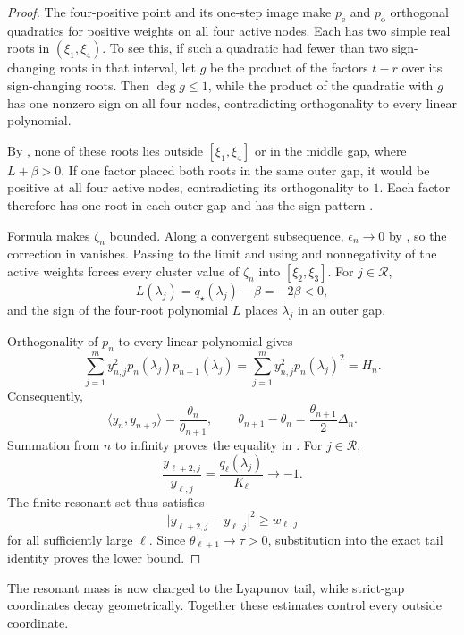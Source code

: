 \documentclass[11pt]{article}
\begin{document}
\begin{proof}
The four-positive point and its one-step image make
\(p_{\mathrm e}\) and \(p_{\mathrm o}\) orthogonal quadratics for positive
weights on all four active nodes.  Each has two simple real roots in
\((\xi_1,\xi_4)\).  To see this, if such a quadratic had fewer than two
sign-changing roots in that interval, let \(g\) be the product of the
factors \(t-r\) over its sign-changing roots.  Then \(\deg g\leq1\), while
the product of the quadratic with \(g\) has one nonzero sign on all four
nodes, contradicting orthogonality to every linear polynomial.

By , none of these roots lies outside
\([\xi_1,\xi_4]\) or in the middle gap, where \(L+\beta>0\).  If one
factor placed both roots in the same outer gap, it would be positive at all
four active nodes, contradicting its orthogonality to \(1\).  Each factor
therefore has one root in each outer gap and has the sign pattern
.

Formula  makes \(\zeta_n\) bounded.  Along a
convergent subsequence, \(\epsilon_n\to0\) by
, so the correction in
 vanishes.  Passing to the limit and using
 and nonnegativity of the active weights
forces every cluster value of \(\zeta_n\) into \([\xi_2,\xi_3]\).
For \(j\in\mathcal R\),
\[
 L(\lambda_j)=q_\star(\lambda_j)-\beta=-2\beta<0,
\]
and the sign of the four-root polynomial \(L\) places \(\lambda_j\) in an
outer gap.

Orthogonality of \(p_n\) to every linear polynomial gives
\[
 \sum_{j=1}^m y_{n,j}^2p_n(\lambda_j)p_{n+1}(\lambda_j)
 =\sum_{j=1}^m y_{n,j}^2p_n(\lambda_j)^2=H_n.
\]
Consequently,
\[
 \langle y_n,y_{n+2}\rangle=\frac{\theta_n}{\theta_{n+1}},
 \qquad
 \theta_{n+1}-\theta_n
 =\frac{\theta_{n+1}}2\Delta_n.
\tag{29}\label{eq:exact-theta-increment}
\]
Summation from \(n\) to infinity proves the equality in
.  For \(j\in\mathcal R\),
\[
 \frac{y_{\ell+2,j}}{y_{\ell,j}}
 =\frac{q_\ell(\lambda_j)}{K_\ell}\longrightarrow-1.
\]
The finite resonant set thus satisfies
\[
 \lvert y_{\ell+2,j}-y_{\ell,j}\rvert^2\geq w_{\ell,j}
\]
for all sufficiently large \(\ell\).  Since
\(\theta_{\ell+1}\to\tau>0\), substitution into the exact tail identity
proves the lower bound.
\end{proof}

The resonant mass is now charged to the Lyapunov tail, while strict-gap
coordinates decay geometrically.  Together these estimates control every
outside coordinate.
\end{document}
